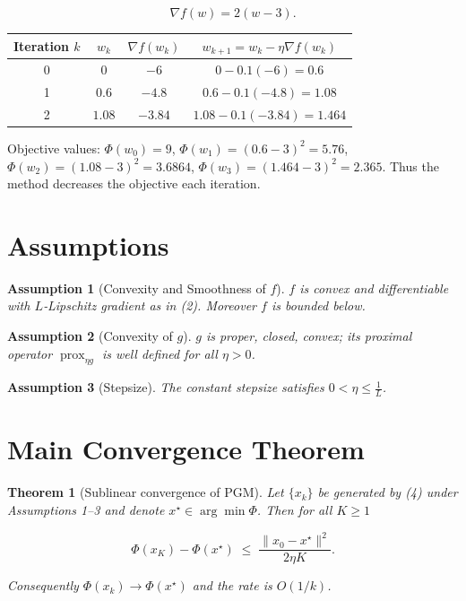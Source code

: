 \documentclass{article}
\newtheorem{theorem}{Theorem}
\newtheorem{assumption}{Assumption}
\newcommand{\prox}{\operatorname{prox}}
\begin{document}
\[
\nabla f(w)=2(w-3).
\]

\begin{center}
\begin{tabular}{c|c|c|c}
Iteration $k$ & $w_{k}$ & $\nabla f(w_{k})$ & $w_{k+1}=w_{k}-\eta\nabla f(w_{k})$ \\ \hline
0 & $0$ & $-6$ & $0-0.1(-6)=0.6$ \\
1 & $0.6$ & $-4.8$ & $0.6-0.1(-4.8)=1.08$ \\
2 & $1.08$ & $-3.84$ & $1.08-0.1(-3.84)=1.464$ \\
\end{tabular}
\end{center}

Objective values: $\Phi(w_{0})=9$, $\Phi(w_{1})=(0.6-3)^{2}=5.76$, $\Phi(w_{2})=(1.08-3)^{2}=3.6864$, $\Phi(w_{3})=(1.464-3)^{2}=2.365$.
Thus the method decreases the objective each iteration.

\newpage

\section*{Assumptions}
\begin{assumption}[Convexity and Smoothness of $f$]
$f$ is convex and differentiable with $L$‑Lipschitz gradient as in (2). Moreover $f$ is bounded below.
\end{assumption}
\begin{assumption}[Convexity of $g$]
$g$ is proper, closed, convex; its proximal operator $\prox_{\eta g}$ is well defined for all $\eta>0$.
\end{assumption}
\begin{assumption}[Stepsize]
The constant stepsize satisfies $0<\eta\le \frac{1}{L}$.
\end{assumption}

\section*{Main Convergence Theorem}
\begin{theorem}[Sublinear convergence of PGM]\label{thm:main}
Let $\{x_{k}\}$ be generated by (4) under Assumptions 1–3 and denote $x^{\star}\in\arg\min\Phi$. Then for all $K\ge1$  

\[
\Phi(x_{K})-\Phi(x^{\star})\;\le\;\frac{\|x_{0}-x^{\star}\|^{2}}{2\eta K}.
\tag{5}
\]

Consequently $\Phi(x_{k})\to\Phi(x^{\star})$ and the rate is $O(1/k)$.
\end{theorem}
\end{document}
